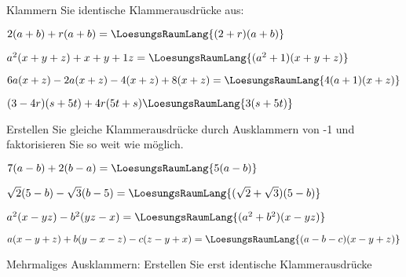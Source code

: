 Klammern Sie identische Klammerausdrücke aus:


\begin{bbwAufgabenBlock}
\item $2(a+b) + r(a+b) = \LoesungsRaumLang{(2+r)(a+b)}$
\item $a^2(x+y+z) + x+y+1z = \LoesungsRaumLang{(a^2+1)(x+y+z)}$
\item $6a(x+z) - 2a(x+z) -4(x+z) + 8(x+z) = \LoesungsRaumLang{4(a+1)(x+z)}$
\item $(3-4r)(s+5t) + 4r(5t+s) \LoesungsRaumLang{3(s+5t)}$

\end{bbwAufgabenBlock}

\newpage


Erstellen Sie gleiche Klammerausdrücke durch Ausklammern von -1 und
faktorisieren Sie so weit wie möglich.

\begin{bbwAufgabenBlock}
\item $7(a-b) + 2(b-a) = \LoesungsRaumLang{5(a-b)}$
\item $\sqrt{2}(5-b) - \sqrt{3}(b-5)=\LoesungsRaumLang{(\sqrt{2}+\sqrt{3})(5-b)}$
\item $a^2(x-yz) - b^2(yz-x) = \LoesungsRaumLang{(a^2+b^2)(x-yz)}$
\item $a(x-y+z)+b(y-x-z) - c(z-y+x) =\LoesungsRaumLang{(a-b-c)(x-y+z)}$
\end{bbwAufgabenBlock}

\newpage




Mehrmaliges Ausklammern: Erstellen Sie erst identische Klammerausdrücke

